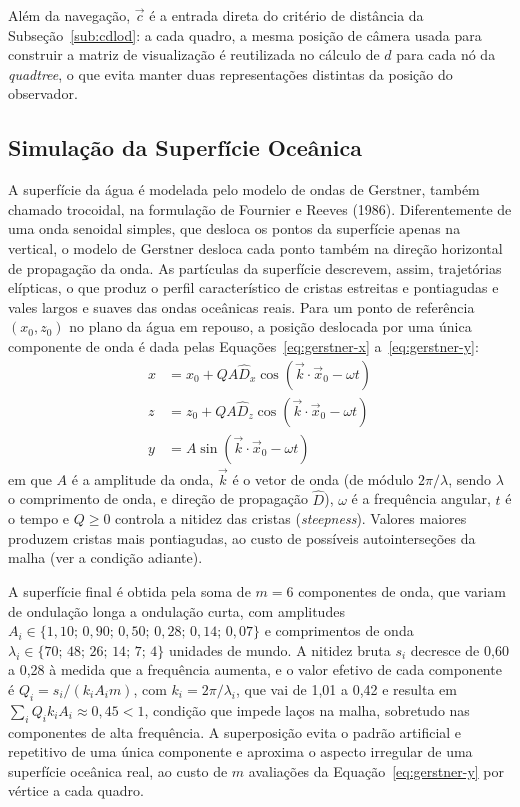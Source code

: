 \documentclass[conference]{IEEEtran}
\begin{document}
Além da navegação, $\vec{c}$ é a entrada direta do critério de distância da
Subseção~\ref{sub:cdlod}: a cada quadro, a mesma posição de câmera usada
para construir a matriz de visualização é reutilizada no cálculo de $d$ para
cada nó da \emph{quadtree}, o que evita manter duas representações
distintas da posição do observador.

\subsection{Simulação da Superfície Oceânica}
\label{sub:agua}

A superfície da água é modelada pelo modelo de ondas de Gerstner, também
chamado trocoidal, na formulação de Fournier e Reeves (1986). Diferentemente
de uma onda senoidal simples, que desloca os pontos da superfície apenas na
vertical, o modelo de Gerstner desloca cada ponto também na direção
horizontal de propagação da onda. As partículas da superfície descrevem,
assim, trajetórias elípticas, o que produz o perfil característico de
cristas estreitas e pontiagudas e vales largos e suaves das ondas oceânicas
reais. Para um ponto de referência $(x_0, z_0)$ no plano da água em repouso,
a posição deslocada por uma única componente de onda é dada pelas
Equações~\eqref{eq:gerstner-x} a~\eqref{eq:gerstner-y}:
\begin{align}
x &= x_0 + Q A \hat{D}_x \cos(\vec{k} \cdot \vec{x}_0 - \omega t) \label{eq:gerstner-x}\\
z &= z_0 + Q A \hat{D}_z \cos(\vec{k} \cdot \vec{x}_0 - \omega t) \label{eq:gerstner-z}\\
y &= A \sin(\vec{k} \cdot \vec{x}_0 - \omega t) \label{eq:gerstner-y}
\end{align}
em que $A$ é a amplitude da onda, $\vec{k}$ é o vetor de onda (de módulo
$2\pi/\lambda$, sendo $\lambda$ o comprimento de onda, e direção de
propagação $\hat{D}$), $\omega$ é a frequência angular, $t$ é o tempo e
$Q \geq 0$ controla a nitidez das cristas (\emph{steepness}). Valores
maiores produzem cristas mais pontiagudas, ao custo de possíveis
autointerseções da malha (ver a condição adiante).

A superfície final é obtida pela soma de $m = 6$ componentes de onda, que
variam de ondulação longa a ondulação curta, com amplitudes
$A_i \in \{1{,}10;\, 0{,}90;\, 0{,}50;\, 0{,}28;\, 0{,}14;\, 0{,}07\}$ e
comprimentos de onda $\lambda_i \in \{70;\, 48;\, 26;\, 14;\, 7;\, 4\}$
unidades de mundo. A nitidez bruta $s_i$ decresce de 0,60 a 0,28 à medida que a
frequência aumenta, e o valor efetivo de cada componente é
$Q_i = s_i/(k_i A_i m)$, com $k_i = 2\pi/\lambda_i$, que vai de 1,01 a 0,42 e
resulta em $\sum_i Q_i k_i A_i \approx 0{,}45 < 1$, condição que impede
laços na malha, sobretudo nas componentes de alta frequência. A superposição
evita o padrão artificial e repetitivo de uma única componente e aproxima o
aspecto irregular de uma superfície oceânica real, ao custo de $m$
avaliações da Equação~\eqref{eq:gerstner-y} por vértice a cada quadro.
\end{document}

